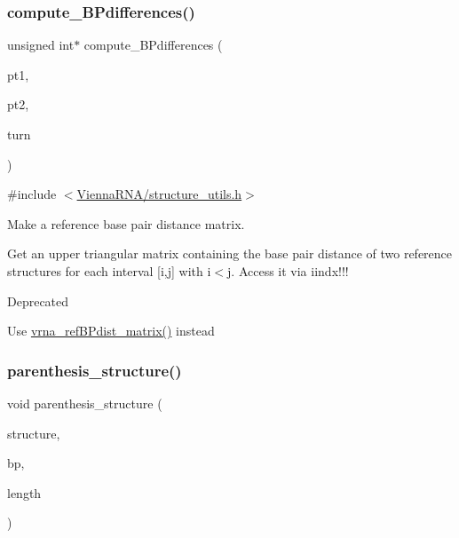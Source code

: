 \subsubsection{\texorpdfstring{compute\+\_\+\+B\+Pdifferences()}{compute\_BPdifferences()}}
{\footnotesize\ttfamily unsigned int$\ast$ compute\+\_\+\+B\+Pdifferences (\begin{DoxyParamCaption}\item[{short $\ast$}]{pt1,  }\item[{short $\ast$}]{pt2,  }\item[{unsigned int}]{turn }\end{DoxyParamCaption})}



{\ttfamily \#include $<$\mbox{\hyperlink{structure__utils_8h}{Vienna\+R\+N\+A/structure\+\_\+utils.\+h}}$>$}



Make a reference base pair distance matrix. 

Get an upper triangular matrix containing the base pair distance of two reference structures for each interval \mbox{[}i,j\mbox{]} with i$<$j. Access it via iindx!!!

\begin{DoxyRefDesc}{Deprecated}
\item[\mbox{\hyperlink{deprecated__deprecated000146}{Deprecated}}]Use \mbox{\hyperlink{group__struct__utils_ga5a27bd058183170afd4716f5b8ff511a}{vrna\+\_\+ref\+B\+Pdist\+\_\+matrix()}} instead \end{DoxyRefDesc}
\mbox{\label{group__struct__utils_gadf0ad2d46c9ca7b850437d1b79627a7e}} 
\subsubsection{\texorpdfstring{parenthesis\+\_\+structure()}{parenthesis\_structure()}}
{\footnotesize\ttfamily void parenthesis\+\_\+structure (\begin{DoxyParamCaption}\item[{char $\ast$}]{structure,  }\item[{\mbox{\hyperlink{group__data__structures_gaa651bda42e7692f08cb603cd6834b0ee}{vrna\+\_\+bp\+\_\+stack\+\_\+t}} $\ast$}]{bp,  }\item[{int}]{length }\end{DoxyParamCaption})}



